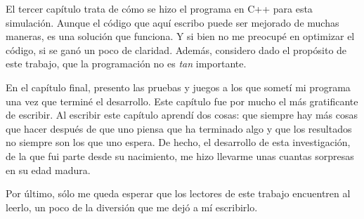 El tercer capítulo trata de cómo se hizo el programa en C++ para esta simulación. 
Aunque el código que aquí escribo puede ser mejorado de muchas maneras, es una solución que funciona.
Y si bien no me preocupé en optimizar el código, si se ganó un poco de claridad. 
Además, considero dado el  propósito de este trabajo, que la programación no es \emph{tan} importante.

En el capítulo final, presento las pruebas y juegos a los que sometí mi programa una vez que terminé el desarrollo.
Este capítulo fue por mucho el más gratificante de escribir.
Al escribir este capítulo aprendí dos cosas: que siempre hay más cosas que hacer después de que uno piensa que ha terminado algo y que los resultados no siempre son los que uno espera.
De hecho, el desarrollo de esta investigación, de la que fui parte desde su nacimiento, me hizo llevarme unas cuantas sorpresas en su edad madura.

Por último, sólo me queda esperar que los lectores de este trabajo encuentren al leerlo, un poco de la diversión que me dejó a mí escribirlo.
